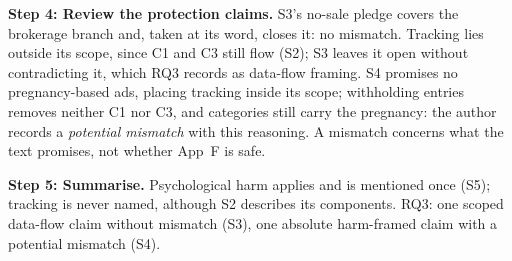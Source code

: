 \textbf{Step 4: Review the protection claims.} S3's no-sale pledge covers the
brokerage branch and, taken at its word, closes it: no mismatch. Tracking lies
outside its scope, since C1 and C3 still flow (S2); S3 leaves it open without
contradicting it, which RQ3 records as data-flow framing. S4 promises no
pregnancy-based ads, placing tracking inside its scope; withholding entries
removes neither C1 nor C3, and categories still carry the pregnancy: the
author records a \emph{potential mismatch} with this reasoning. A mismatch
concerns what the text promises, not whether App~F is safe.

\textbf{Step 5: Summarise.} Psychological harm applies and is mentioned once
(S5); tracking is never named, although S2 describes its components. RQ3: one
scoped data-flow claim without mismatch (S3), one absolute harm-framed claim
with a potential mismatch (S4).
